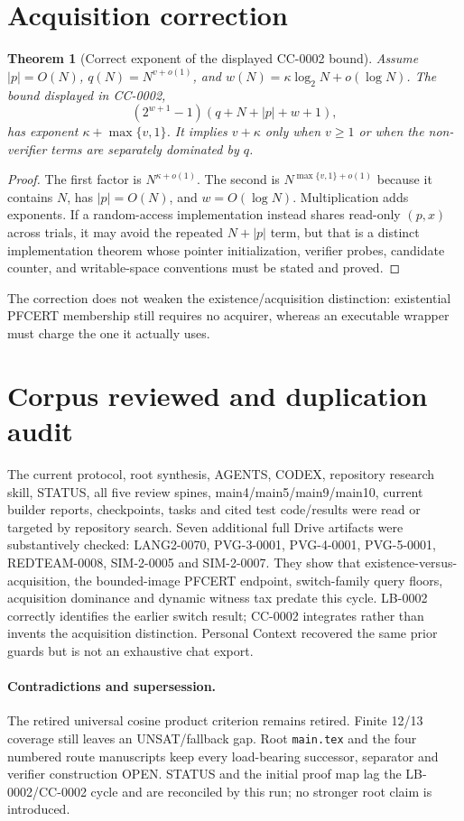 \documentclass[11pt]{article}
\newtheorem{theorem}{Theorem}
\begin{document}
\section{Acquisition correction}
\begin{theorem}[Correct exponent of the displayed CC-0002 bound]
Assume $|p|=O(N)$,
$q(N)=N^{v+o(1)}$, and
$w(N)=\kappa\log_2N+o(\log N)$.  The bound displayed in CC-0002,
\[
 (2^{w+1}-1)(q+N+|p|+w+1),
\]
has exponent $\kappa+\max\{v,1\}$.  It implies $v+\kappa$ only when
$v\ge1$ or when the non-verifier terms are separately dominated by $q$.
\end{theorem}
\begin{proof}
The first factor is $N^{\kappa+o(1)}$.  The second is
$N^{\max\{v,1\}+o(1)}$ because it contains $N$, has $|p|=O(N)$, and
$w=O(\log N)$.  Multiplication adds exponents.  If a random-access
implementation instead shares read-only $(p,x)$ across trials, it may avoid
the repeated $N+|p|$ term, but that is a distinct implementation theorem
whose pointer initialization, verifier probes, candidate counter, and
writable-space conventions must be stated and proved.
\end{proof}
The correction does not weaken the existence/acquisition distinction:
existential PFCERT membership still requires no acquirer, whereas an
executable wrapper must charge the one it actually uses.

\section{Corpus reviewed and duplication audit}
The current protocol, root synthesis, AGENTS, CODEX, repository research
skill, STATUS, all five review spines, main4/main5/main9/main10, current
builder reports, checkpoints, tasks and cited test code/results were read or
targeted by repository search.  Seven additional full Drive artifacts were
substantively checked: LANG2-0070, PVG-3-0001, PVG-4-0001, PVG-5-0001,
REDTEAM-0008, SIM-2-0005 and SIM-2-0007.  They show that
existence-versus-acquisition, the bounded-image PFCERT endpoint, switch-family
query floors, acquisition dominance and dynamic witness tax predate this
cycle.  LB-0002 correctly identifies the earlier switch result; CC-0002
integrates rather than invents the acquisition distinction.  Personal
Context recovered the same prior guards but is not an exhaustive chat export.

\paragraph{Contradictions and supersession.}
The retired universal cosine product criterion remains retired.  Finite
12/13 coverage still leaves an UNSAT/fallback gap.  Root \texttt{main.tex}
and the four numbered route manuscripts keep every load-bearing successor,
separator and verifier construction OPEN.  STATUS and the initial proof map
lag the LB-0002/CC-0002 cycle and are reconciled by this run; no stronger
root claim is introduced.
\end{document}
